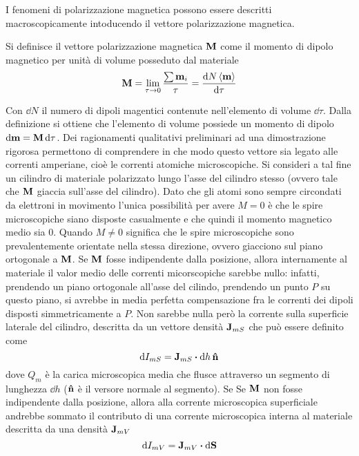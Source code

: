 I fenomeni di polarizzazione magnetica possono essere descritti macroscopicamente intoducendo il vettore
polarizzazione magnetica.
\begin{defn}
    Si definisce il vettore polarizzazione magnetica $\vb{M}$ come il momento
    di dipolo magnetico per unità di volume posseduto dal materiale
    \[
        \vb{M}=\lim_{\tau\to 0}\frac{\sum \vb{m}_i}{\tau}=\frac{\dd{N}  \expval{\vb{m}}}{\dd{\tau}}
    \]
\end{defn}
Con $\dd{N}$ il numero di dipoli magentici contenute nell'elemento di volume $\dd{\tau}$.
Dalla definizione si ottiene che l'elemento di volume possiede un momento di dipolo $\dd{\vb{m}}=\vb{M}\dd{\tau}$.
Dei ragionamenti qualitativi preliminari ad una dimostrazione rigorosa permettono di comprendere in che modo
questo vettore sia legato alle correnti amperiane, cioè le correnti atomiche microscopiche.
Si consideri a tal fine un cilindro di materiale polarizzato lungo l'asse del cilindro stesso (ovvero tale che
$\vb{M}$ giaccia sull'asse del cilindro).
Dato che gli atomi sono sempre circondati da elettroni in movimento
l'unica possibilità per avere $M=0$ è che le spire microscopiche siano disposte casualmente
e che quindi il momento magnetico medio sia $0$. Quando $M\neq0$ significa che le spire microscopiche
sono prevalentemente orientate nella stessa direzione, ovvero giacciono sul piano ortogonale a $\vb{M}$.
Se $\vb{M}$ fosse indipendente dalla posizione, allora internamente al
materiale il valor medio delle correnti micorscopiche sarebbe nullo: infatti, prendendo un piano ortogonale
all'asse del cilindo, prendendo un punto $P$ su questo piano, si avrebbe in media perfetta compensazione fra
le correnti dei dipoli disposti simmetricamente a $P$. Non sarebbe nulla però la corrente sulla superficie
laterale del cilindro, descritta da un vettore densità $\vb{J}_{mS}$ che può essere definito come
\[
    \dd{I_{mS}}=\vb{J}_{mS}\vdot \dd{h}\vu{n}
\]
dove $Q_m$ è la carica microscopica media che flusce attraverso un segmento di lunghezza $\dd{h}$ ($\vu{n}$ è il
versore normale al segmento).
Se Se $\vb{M}$ non fosse indipendente dalla posizione, allora alla corrente microscopica superficiale andrebbe sommato
il contributo di una corrente microscopica interna al materiale descritta da una densità $\vb{J}_{mV}$
\[
    \dd{I_{mV}}=\vb{J}_{mV}\vdot \dd{\vb{S}}
\]

